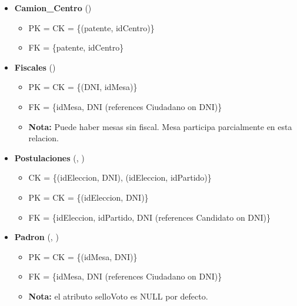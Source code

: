 \begin{itemize}
	
	\item \textbf{Camion\_Centro} () 
	\begin{itemize}
		\item PK = CK = \{(patente, idCentro)\}
		\item FK = \{patente, idCentro\}
	\end{itemize}
	\vspace{1mm}

	\item \textbf{Fiscales} () 
	\begin{itemize}
		\item PK = CK = \{(DNI, idMesa)\}
		\item FK = \{idMesa, DNI  (references Ciudadano on DNI)\}
		\item \textbf{Nota:} Puede haber mesas sin fiscal. Mesa participa parcialmente en esta relacion.
	\end{itemize}
	\vspace{1mm}

	\item \textbf{Postulaciones} (, ) 
	\begin{itemize}
		\item CK = \{(idEleccion, DNI), (idEleccion, idPartido)\}
		\item PK = CK = \{(idEleccion, DNI)\}
		\item FK = \{idEleccion, idPartido, DNI (references Candidato on DNI)\}
	\end{itemize}
	\vspace{1mm}
	
	\item \textbf{Padron} (, ) 
	\begin{itemize}
		\item PK = CK = \{(idMesa, DNI)\}
		\item FK = \{idMesa, DNI (references Ciudadano on DNI)\}
		\item \textbf{Nota:} el atributo selloVoto es NULL por defecto.
	\end{itemize}
	\vspace{1mm}

\end{itemize}

